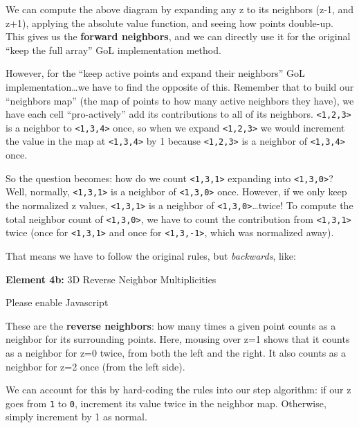 \documentclass[]{article}
\begin{document}
We can compute the above diagram by expanding any z to its neighbors (z-1, and
z+1), applying the absolute value function, and seeing how points double-up.
This gives us the \textbf{forward neighbors}, and we can directly use it for the
original ``keep the full array'' GoL implementation method.

However, for the ``keep active points and expand their neighbors'' GoL
implementation\ldots we have to find the opposite of this. Remember that to
build our ``neighbors map'' (the map of points to how many active neighbors they
have), we have each cell ``pro-actively'' add its contributions to all of its
neighbors. \texttt{\textless{}1,2,3\textgreater{}} is a neighbor to
\texttt{\textless{}1,3,4\textgreater{}} once, so when we expand
\texttt{\textless{}1,2,3\textgreater{}} we would increment the value in the map
at \texttt{\textless{}1,3,4\textgreater{}} by 1 because
\texttt{\textless{}1,2,3\textgreater{}} is a neighbor of
\texttt{\textless{}1,3,4\textgreater{}} once.

So the question becomes: how do we count \texttt{\textless{}1,3,1\textgreater{}}
expanding into \texttt{\textless{}1,3,0\textgreater{}}? Well, normally,
\texttt{\textless{}1,3,1\textgreater{}} is a neighbor of
\texttt{\textless{}1,3,0\textgreater{}} once. However, if we only keep the
normalized z values, \texttt{\textless{}1,3,1\textgreater{}} is a neighbor of
\texttt{\textless{}1,3,0\textgreater{}}\ldots twice! To compute the total
neighbor count of \texttt{\textless{}1,3,0\textgreater{}}, we have to count the
contribution from \texttt{\textless{}1,3,1\textgreater{}} twice (once for
\texttt{\textless{}1,3,1\textgreater{}} and once for
\texttt{\textless{}1,3,-1\textgreater{}}, which was normalized away).

That means we have to follow the original rules, but \emph{backwards}, like:

\leavevmode\hypertarget{golSyms3DReverse}{}%
\textbf{Element 4b:} 3D Reverse Neighbor Multiplicities

\leavevmode\hypertarget{golSyms3DReverseCont}{}%
Please enable Javascript

These are the \textbf{reverse neighbors}: how many times a given point counts as
a neighbor for its surrounding points. Here, mousing over z=1 shows that it
counts as a neighbor for z=0 twice, from both the left and the right. It also
counts as a neighbor for z=2 once (from the left side).

We can account for this by hard-coding the rules into our step algorithm: if our
z goes from \texttt{1} to \texttt{0}, increment its value twice in the neighbor
map. Otherwise, simply increment by 1 as normal.
\end{document}
